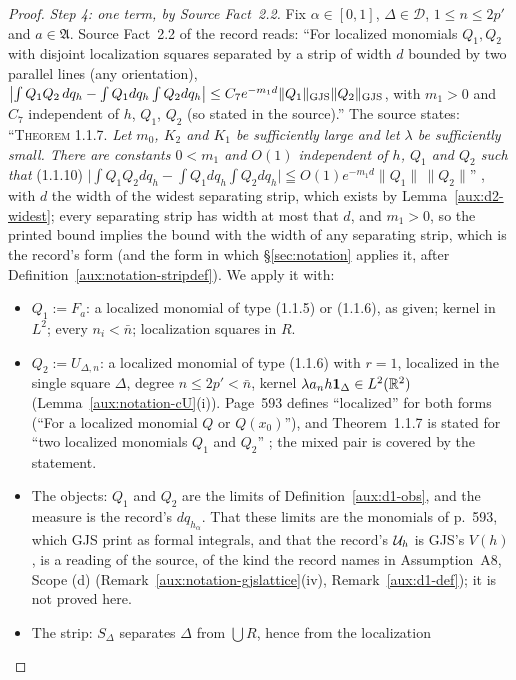 \begin{proof}
\emph{Step 4: one term, by Source Fact~2.2.}  Fix $\alpha\in[0,1]$, $\Delta\in\mathcal D$,
$1\le n\le2p'$ and $a\in\mathfrak A$.  Source Fact~2.2 of the record \cite[p.~10]{R} reads:
``For localized monomials $Q_1,Q_2$ with disjoint localization squares separated by a strip of
width $d$ bounded by two parallel lines (any orientation),
$\bigl|\int Q_1Q_2\,dq_h-\int Q_1dq_h\int Q_2dq_h\bigr|\le
C_7e^{-m_1d}\|Q_1\|_{\rm GJS}\|Q_2\|_{\rm GJS}$, with $m_1>0$ and $C_7$ independent of $h$,
$Q_1$, $Q_2$ (so stated in the source).''  The source states: ``\textsc{Theorem} 1.1.7.
\emph{Let $m_0$, $K_2$ and $K_1$ be sufficiently large and let $\lambda$ be sufficiently small.
There are constants $0<m_1$ and $O(1)$ independent of $h$, $Q_1$ and $Q_2$ such that}
(1.1.10) $\bigl|\int Q_1Q_2dq_h-\int Q_1dq_h\int Q_2dq_h\bigr|\leqq O(1)e^{-m_1d}\|Q_1\|\,
\|Q_2\|$'' \cite[p.~594]{GJS}, with $d$ the width of the widest separating strip, which exists by
Lemma~\ref{aux:d2-widest}; every separating strip has width at most that $d$, and $m_1>0$, so the
printed bound implies the bound with the width of any separating strip, which is the record's form
(and the form in which \S\ref{sec:notation} applies it, after
Definition~\ref{aux:notation-stripdef}).  We apply it with:
\begin{itemize}
\item $Q_1:=F_a$: a localized monomial of type (1.1.5) or (1.1.6), as given; kernel in $L^2$;
  every $n_i<\bar n$; localization squares in $R$.
\item $Q_2:=U_{\Delta,n}$: a localized monomial of type (1.1.6) with $r=1$, localized in the
  single square $\Delta$, degree $n\le2p'<\bar n$, kernel $\lambda a_nh\mathbf 1_\Delta\in
  L^2(\mathbb{R}^2)$ (Lemma~\ref{aux:notation-cU}(i)).  Page~593 defines ``localized'' for both forms (``For a
  localized monomial $Q$ or $Q(x_0)$''), and Theorem~1.1.7 is stated for ``two localized
  monomials $Q_1$ and $Q_2$'' \cite[p.~594]{GJS}; the mixed pair is covered by the statement.
\item The objects: $Q_1$ and $Q_2$ are the limits of Definition~\ref{aux:d1-obs}, and the measure
  is the record's $dq_{h_\alpha}$.  That these limits are the monomials of p.~593, which GJS print
  as formal integrals, and that the record's $\mathcal U_h$ is GJS's $V(h)$, is a reading of the
  source, of the kind the record names in Assumption~A8, Scope (d)
  (Remark~\ref{aux:notation-gjslattice}(iv), Remark~\ref{aux:d1-def}); it is not proved here.
\item The strip: $S_\Delta$ separates $\Delta$ from $\bigcup R$, hence from the localization

\end{itemize}
\end{proof}
